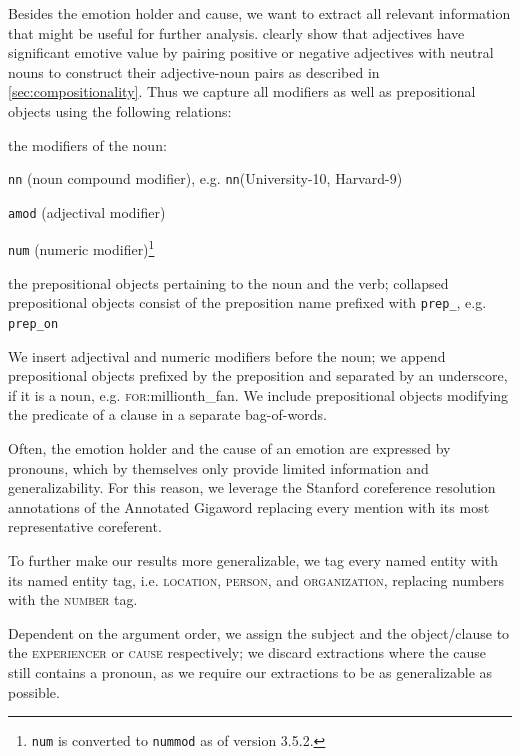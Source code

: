 Besides the emotion holder and cause, we want to extract all relevant information that might be useful for further analysis. \citeauthor{adjective_noun_pairs} clearly show that adjectives have significant emotive value by pairing positive or negative adjectives with neutral nouns to construct their adjective-noun pairs as described in \ref{sec:compositionality}. Thus we capture all modifiers as well as prepositional objects using the following relations:
\begin{aenumerate}
	\item the modifiers of the noun:
	\begin{aenumerate}
		\item \texttt{nn} (noun compound modifier), e.g. \texttt{nn}(University-10, Harvard-9)
		\item \texttt{amod} (adjectival modifier)
		\item \texttt{num} (numeric modifier)\footnote{\texttt{num} is converted to \texttt{nummod} as of version 3.5.2.}
	\end{aenumerate}
	\item the prepositional objects pertaining to the noun and the verb; collapsed prepositional objects consist of the preposition name prefixed with \texttt{prep\_}, e.g. \texttt{prep\_on}
\end{aenumerate}

We insert adjectival and numeric modifiers before the noun; we append prepositional objects prefixed by the preposition and separated by an underscore, if it is a noun, e.g. \textsc{for}:millionth\_fan. We include prepositional objects modifying the predicate of a clause in a separate bag-of-words.

Often, the emotion holder and the cause of an emotion are expressed by pronouns, which by themselves only provide limited information and generalizability. For this reason, we leverage the Stanford coreference resolution annotations of the Annotated Gigaword replacing every mention with its most representative coreferent.

To further make our results more generalizable, we tag every named entity with its named entity tag, i.e. \textsc{location}, \textsc{person}, and \textsc{organization}, replacing numbers with the \textsc{number} tag.

Dependent on the argument order, we assign the subject and the object/clause to the \textsc{experiencer} or \textsc{cause} respectively; we discard extractions where the cause still contains a pronoun, as we require our extractions to be as generalizable as possible.

